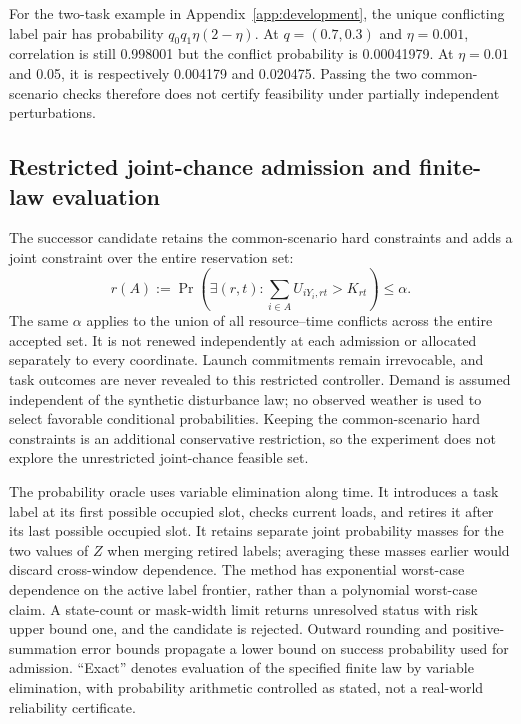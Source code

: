 \documentclass[11pt,a4paper]{article}
\begin{document}
For the two-task example in Appendix~\ref{app:development}, the unique conflicting label pair has probability $q_0q_1\eta(2-\eta)$. At $q=(0.7,0.3)$ and $\eta=0.001$, correlation is still 0.998001 but the conflict probability is 0.00041979. At $\eta=0.01$ and 0.05, it is respectively 0.004179 and 0.020475. Passing the two common-scenario checks therefore does not certify feasibility under partially independent perturbations.

\subsection{Restricted joint-chance admission and finite-law evaluation}
The successor candidate retains the common-scenario hard constraints and adds a joint constraint over the entire reservation set:
\begin{equation}
 r(A):=\Pr\!\left(\exists(r,t):\sum_{i\in A}U_{iY_i,rt}>K_{rt}\right)\leq\alpha.
\end{equation}
The same $\alpha$ applies to the union of all resource--time conflicts across the entire accepted set. It is not renewed independently at each admission or allocated separately to every coordinate. Launch commitments remain irrevocable, and task outcomes are never revealed to this restricted controller. Demand is assumed independent of the synthetic disturbance law; no observed weather is used to select favorable conditional probabilities. Keeping the common-scenario hard constraints is an additional conservative restriction, so the experiment does not explore the unrestricted joint-chance feasible set.

The probability oracle uses variable elimination along time. It introduces a task label at its first possible occupied slot, checks current loads, and retires it after its last possible occupied slot. It retains separate joint probability masses for the two values of $Z$ when merging retired labels; averaging these masses earlier would discard cross-window dependence. The method has exponential worst-case dependence on the active label frontier, rather than a polynomial worst-case claim. A state-count or mask-width limit returns unresolved status with risk upper bound one, and the candidate is rejected. Outward rounding and positive-summation error bounds propagate a lower bound on success probability used for admission. ``Exact'' denotes evaluation of the specified finite law by variable elimination, with probability arithmetic controlled as stated, not a real-world reliability certificate.
\end{document}
